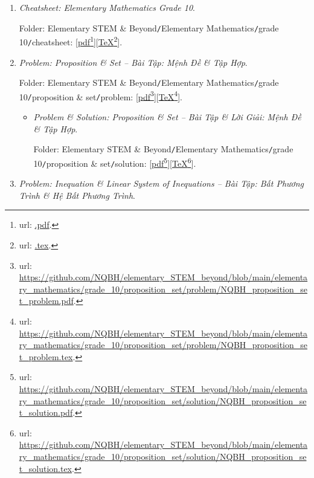 \documentclass[12pt]{article}
\begin{document}
\begin{enumerate}
	\item {\it Cheatsheet: Elementary Mathematics Grade 10}.
	
	Folder: {\sf Elementary STEM \& Beyond{\tt/}Elementary Mathematics{\tt/}grade 10{\tt/}cheatsheet}: [\href{.pdf}{pdf}\footnote{{\sc url}: \url{.pdf}.}][\href{.tex}{\TeX}\footnote{{\sc url}: \url{.tex}.}].
	\item {\it Problem: Proposition \& Set -- Bài Tập: Mệnh Đề \& Tập Hợp}.
	
	Folder: {\sf Elementary STEM \& Beyond{\tt/}Elementary Mathematics{\tt/}grade 10{\tt/}proposition \& set{\tt/}problem}: [\href{https://github.com/NQBH/elementary_STEM_beyond/blob/main/elementary_mathematics/grade_10/proposition_set/problem/NQBH_proposition_set_problem.pdf}{pdf}\footnote{{\sc url}: \url{https://github.com/NQBH/elementary_STEM_beyond/blob/main/elementary_mathematics/grade_10/proposition_set/problem/NQBH_proposition_set_problem.pdf}.}][\href{https://github.com/NQBH/elementary_STEM_beyond/blob/main/elementary_mathematics/grade_10/proposition_set/problem/NQBH_proposition_set_problem.tex}{\TeX}\footnote{{\sc url}: \url{https://github.com/NQBH/elementary_STEM_beyond/blob/main/elementary_mathematics/grade_10/proposition_set/problem/NQBH_proposition_set_problem.tex}.}].
	\begin{itemize}
		\item {\it Problem \& Solution: Proposition \& Set -- Bài Tập \& Lời Giải: Mệnh Đề \& Tập Hợp}.
		
		Folder: {\sf Elementary STEM \& Beyond{\tt/}Elementary Mathematics{\tt/}grade 10{\tt/}proposition \& set{\tt/}solution}: [\href{https://github.com/NQBH/elementary_STEM_beyond/blob/main/elementary_mathematics/grade_10/proposition_set/solution/NQBH_proposition_set_solution.pdf}{pdf}\footnote{{\sc url}: \url{https://github.com/NQBH/elementary_STEM_beyond/blob/main/elementary_mathematics/grade_10/proposition_set/solution/NQBH_proposition_set_solution.pdf}.}][\href{https://github.com/NQBH/elementary_STEM_beyond/blob/main/elementary_mathematics/grade_10/proposition_set/solution/NQBH_proposition_set_solution.tex}{\TeX}\footnote{{\sc url}: \url{https://github.com/NQBH/elementary_STEM_beyond/blob/main/elementary_mathematics/grade_10/proposition_set/solution/NQBH_proposition_set_solution.tex}.}].
	\end{itemize}
	\item {\it Problem: Inequation \& Linear System of Inequations -- Bài Tập: Bất Phương Trình \& Hệ Bất Phương Trình}.
	

\end{enumerate}
\end{document}
